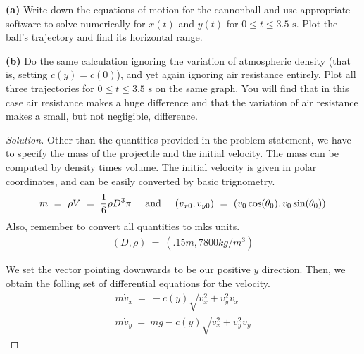 \documentclass{article}
\numberwithin{equation}{section}
\newcommand{\textAnd}{
    {
        \hspace{5mm}
        \textrm{and}
        \hspace{5mm}
    }
}
\begin{document}
\textbf{(a)} Write down the equations of motion for the cannonball and use appropriate software to solve numerically for \(x(t)\) and \(y(t)\) for \(0 \leq t \leq 3.5 \text{ s}\). Plot the ball’s trajectory and find its horizontal range.

\textbf{(b)} Do the same calculation ignoring the variation of atmospheric density (that is, setting \(c(y) = c(0)\)), and yet again ignoring air resistance entirely. Plot all three trajectories for \(0 \leq t \leq 3.5 \text{ s}\) on the same graph. You will find that in this case air resistance makes a huge difference and that the variation of air resistance makes a small, but not negligible, difference.


\begin{proof}[Solution]
    Other than the quantities provided in the problem statement, 
    we have to specify the mass of the projectile and the initial velocity. 
    The mass can be computed by density times volume. The initial 
    velocity is given in polar coordinates, and can be easily converted 
    by basic trignometry. 
    \begin{equation}
        m \ =\ \rho V \ = \ \frac 1 6 \rho D^3 \pi 
        \textAnd 
        (v_{x0} , v_{y0}) \ = \ (v_0\cos(\theta_0), v_0 \sin(\theta_0))
    \end{equation}
    Also, remember to convert all quantities to mks units. 
    \begin{eqnarray}
        (D, \rho) \ = \ (.15m, 7800kg/m^3)
    \end{eqnarray}

    We set the vector pointing downwards to be our positive $y$ direction. 
    Then, we obtain the folling set of differential equations for the velocity. 
    \begin{eqnarray}
        m\dot v_x \ = \ -c(y) \sqrt{v_x^2 + v_y^2} v_x \nonumber \\ 
        m\dot v_y \ = \ mg - c(y) \sqrt{v_x^2 + v_y^2} v_y
    \end{eqnarray}
    

\end{proof}
\end{document}

